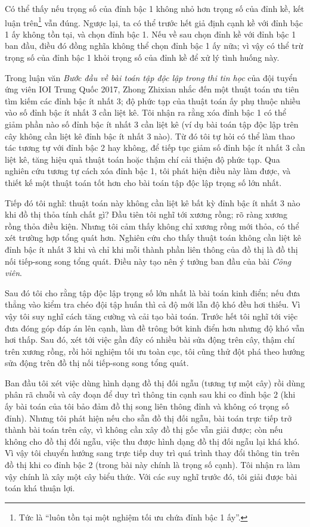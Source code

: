\documentclass[11pt]{article}
\begin{document}
Có thể thấy nếu trọng số của đỉnh bậc 1 không nhỏ hơn trọng số của đỉnh kề,
kết luận trên\footnote{Tức là ``luôn tồn tại một nghiệm tối ưu chứa đỉnh bậc
1 ấy''.} vẫn đúng. Ngược lại, ta có thể trước hết giả định cạnh kề với đỉnh
bậc 1 ấy không tồn tại, và chọn đỉnh bậc 1. Nếu về sau chọn đỉnh kề với đỉnh
bậc 1 ban đầu, điều đó đồng nghĩa không thể chọn đỉnh bậc 1 ấy nữa; vì vậy có
thể trừ trọng số của đỉnh bậc 1 khỏi trọng số của đỉnh kề để xử lý tình huống
này.

Trong luận văn \emph{Bước đầu về bài toán tập độc lập trong thi tin học} của
đội tuyển ứng viên IOI Trung Quốc 2017, Zhong Zhixian nhắc đến một thuật toán
ưu tiên tìm kiếm các đỉnh bậc ít nhất 3; độ phức tạp của thuật toán ấy phụ
thuộc nhiều vào số đỉnh bậc ít nhất 3 cần liệt kê. Tôi nhận ra rằng xóa đỉnh
bậc 1 có thể giảm phần nào số đỉnh bậc ít nhất 3 cần liệt kê (ví dụ bài toán
tập độc lập trên cây không cần liệt kê đỉnh bậc ít nhất 3 nào). Từ đó tôi tự
hỏi có thể làm thao tác tương tự với đỉnh bậc 2 hay không, để tiếp tục giảm
số đỉnh bậc ít nhất 3 cần liệt kê, tăng hiệu quả thuật toán hoặc thậm chí cải
thiện độ phức tạp. Qua nghiên cứu tương tự cách xóa đỉnh bậc 1, tôi phát hiện
điều này làm được, và thiết kế một thuật toán tốt hơn cho bài toán tập độc lập
trọng số lớn nhất.

Tiếp đó tôi nghĩ: thuật toán này không cần liệt kê bất kỳ đỉnh bậc ít nhất 3
nào khi đồ thị thỏa tính chất gì? Đầu tiên tôi nghĩ tới xương rồng; rõ ràng
xương rồng thỏa điều kiện. Nhưng tôi cảm thấy không chỉ xương rồng mới thỏa,
có thể xét trường hợp tổng quát hơn. Nghiên cứu cho thấy thuật toán không cần
liệt kê đỉnh bậc ít nhất 3 khi và chỉ khi mỗi thành phần liên thông của đồ thị
là đồ thị nối tiếp-song song tổng quát. Điều này tạo nên ý tưởng ban đầu của
bài \emph{Công viên}.

Sau đó tôi cho rằng tập độc lập trọng số lớn nhất là bài toán kinh điển; nếu
đưa thẳng vào kiểm tra chéo đội tập huấn thì cả độ mới lẫn độ khó đều hơi
thiếu. Vì vậy tôi suy nghĩ cách tăng cường và cải tạo bài toán. Trước hết tôi
nghĩ tới việc đưa đóng góp đáp án lên cạnh, làm đề trông bớt kinh điển hơn
nhưng độ khó vẫn hơi thấp. Sau đó, xét tới việc gần đây có nhiều bài sửa động
trên cây, thậm chí trên xương rồng, rồi hỏi nghiệm tối ưu toàn cục, tôi cũng
thử đột phá theo hướng sửa động trên đồ thị nối tiếp-song song tổng quát.

Ban đầu tôi xét việc dùng hình dạng đồ thị đối ngẫu (tương tự một cây) rồi
dùng phân rã chuỗi và cây đoạn để duy trì thông tin cạnh sau khi co đỉnh bậc 2
(khi ấy bài toán của tôi bảo đảm đồ thị song liên thông đỉnh và không có trọng
số đỉnh). Nhưng tôi phát hiện nếu cho sẵn đồ thị đối ngẫu, bài toán trực tiếp
trở thành bài toán trên cây, vì không cần xây đồ thị gốc vẫn giải được; còn
nếu không cho đồ thị đối ngẫu, việc thu được hình dạng đồ thị đối ngẫu lại khá
khó. Vì vậy tôi chuyển hướng sang trực tiếp duy trì quá trình thay đổi thông
tin trên đồ thị khi co đỉnh bậc 2 (trong bài này chính là trọng số cạnh). Tôi
nhận ra làm vậy chính là xây một cây biểu thức. Với các suy nghĩ trước đó, tôi
giải được bài toán khá thuận lợi.
\end{document}
